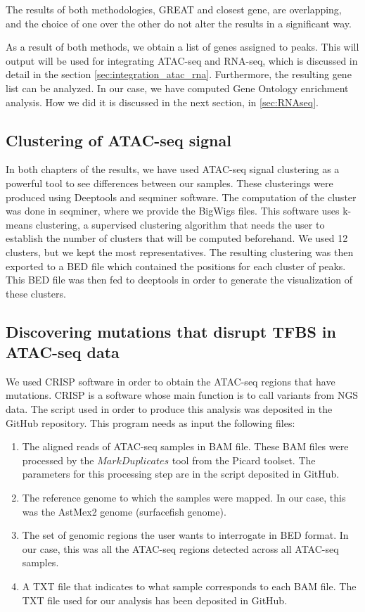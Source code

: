 The results of both methodologies, GREAT and closest gene, are overlapping, and the choice of one over the other do not alter the results in a significant way. 

As a result of both methods, we obtain a list of genes assigned to peaks. This will output will be used for integrating ATAC-seq and RNA-seq, which is discussed in detail in the section \ref{sec:integration_atac_rna}. Furthermore, the resulting gene list can be analyzed. In our case, we have computed Gene Ontology enrichment analysis. How we did it is discussed in the next section, in \ref{sec:RNAseq}.

\subsection{Clustering of ATAC-seq signal}

In both chapters of the results, we have used ATAC-seq signal clustering as a powerful tool to see differences between our samples. These clusterings were produced using Deeptools \parencite{ramirez_deeptools2_2016} and seqminer \parencite{ye_seqminer_2011} software. The computation of the cluster was done in seqminer, where we provide the BigWigs files. This software uses k-means clustering, a supervised clustering algorithm that needs the user to establish the number of clusters that will be computed beforehand. We used 12 clusters, but we kept the most representatives. The resulting clustering was then exported to a BED file which contained the positions for each cluster of peaks. This BED file was then fed to deeptools in order to generate the visualization of these clusters.


\subsection{Discovering mutations that disrupt TFBS in ATAC-seq data}

We used CRISP software \parencite{bansal_statistical_2010} in order to obtain the ATAC-seq regions that have mutations. CRISP is a software whose main function is to call variants from NGS data. The script used in order to produce this analysis was deposited in the GitHub repository. This program needs as input the following files:

\begin{enumerate}
    \item The aligned reads of ATAC-seq samples in BAM file. These BAM files were processed by the $MarkDuplicates$ tool from the Picard toolset. The parameters for this processing step are in the script deposited in GitHub.
    \item The reference genome to which the samples were mapped. In our case, this was the AstMex2 genome (surfacefish genome).
    \item The set of genomic regions the user wants to interrogate in BED format. In our case, this was all the ATAC-seq regions detected across all ATAC-seq samples.
    \item A TXT file that indicates to what sample corresponds to each BAM file. The TXT file used for our analysis has been deposited in GitHub.
\end{enumerate}

